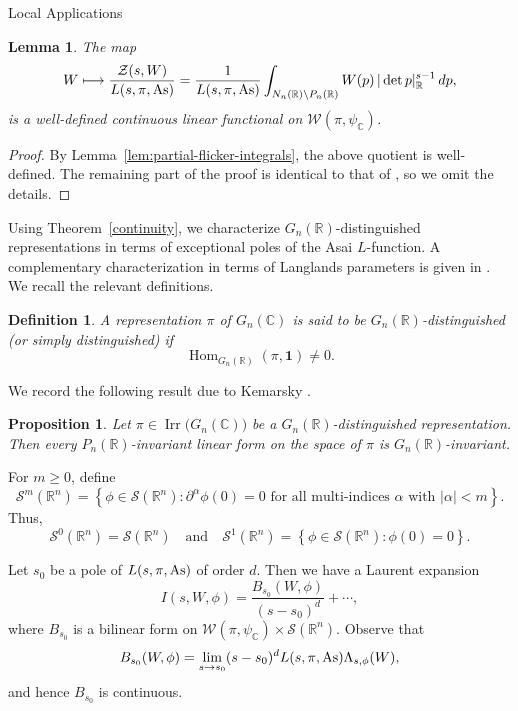 \documentclass[12pt,reqno]{amsart}
\numberwithin{equation}{section}%
\numberwithin{equation}{subsection}
\newtheorem{prop}[equation]{Proposition}
\newtheorem{lemma}[equation]{Lemma}
\newtheorem{defn}[equation]{Definition}
\theoremstyle{definition}
\theoremstyle{remark}
\begin{document}
\begin{section}{Local Applications}
\begin{lemma}\label{mirabolic-integral}
The map
\[
W \longmapsto
\frac{\mathcal{Z}(s,W)}{L(s,\pi,{\rm As})}
=
\frac{1}{L(s,\pi,{\rm As})}
\int_{N_n(\mathbb{R})\backslash P_n(\mathbb{R})}
W(p)\,|\det p|_{\mathbb{R}}^{s-1}\,dp,
\]
is a well-defined continuous linear functional on
\(\mathcal{W}(\pi,\psi_{\mathbb{C}})\).
\end{lemma}

\begin{proof}
By Lemma~\ref{lem:partial-flicker-integrals}, the above quotient is 
well-defined. The remaining part of the proof is identical to that of \cite[Proposition~3.2]{Chai2015}, so we omit the details.
\end{proof}
   
Using Theorem~\ref{continuity}, we characterize
\(G_n(\mathbb{R})\)-distinguished representations in terms of exceptional
poles of the Asai \(L\)-function. A complementary characterization in
terms of Langlands parameters is given in \cite[Theorem 1.1]{PWZ2025}. We recall the relevant definitions.

\begin{defn}
A representation \(\pi\) of \(G_n(\mathbb{C})\) is said to be
\(G_n(\mathbb{R})\)-\emph{distinguished} (or simply distinguished) if
\[
\operatorname{Hom}_{G_n(\mathbb{R})}(\pi,\mathbf{1})\neq0.
\]
\end{defn}

We record the following result due to Kemarsky \cite{Kemarsky2015}.

\begin{prop}\label{mirabolic-invariance}
Let $\pi \in \operatorname{Irr}\bigl(G_n(\mathbb{C})\bigr)
$ be a $G_n(\mathbb{R})$-distinguished representation. Then every \(P_n(\mathbb{R})\)-invariant
linear form on the space of \(\pi\) is \(G_n(\mathbb{R})\)-invariant.
\end{prop}



For \(m \geq 0\), define
\[
\mathcal{S}^{m}(\mathbb{R}^{n})
=
\left\{
\phi \in \mathcal{S}(\mathbb{R}^{n})
:
\partial^{\alpha}\phi(0)=0
\text{ for all multi-indices } \alpha \text{ with } |\alpha|<m
\right\}.
\]
Thus,
\[
\mathcal{S}^{0}(\mathbb{R}^{n})=\mathcal{S}(\mathbb{R}^{n})\quad\text{and}\quad 
\mathcal{S}^{1}(\mathbb{R}^{n})
=
\left\{
\phi \in \mathcal{S}(\mathbb{R}^{n})
:
\phi(0)=0
\right\}.
\]

Let \(s_0\) be a pole of \(L(s,\pi,{\rm As})\) of order \(d\). Then we have a
Laurent expansion
\[
I(s,W,\phi)
=
\frac{B_{s_0}(W,\phi)}{(s-s_0)^d}
+\cdots,
\]
where \(B_{s_0}\) is a bilinear form on
$\mathcal{W}(\pi,\psi_{\mathbb{C}})
\times
\mathcal{S}(\mathbb{R}^{n}).$ Observe that
\[ B_{s_0}(W,\phi) = \lim_{s\to s_0} (s-s_0)^d L(s,\pi,{\rm As})\Lambda_{s,\phi}(W), \] and hence  \(B_{s_0}\) is continuous.


\end{section}
\end{document}
